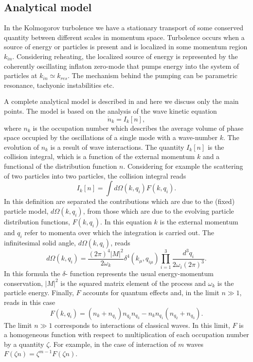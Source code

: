 \documentclass[11pt,a4paper,twoside]{book}
\begin{document}
\subsection{Analytical model}
In the Kolmogorov turbolence we have a stationary transport of some conserved quantity between different scales in momentum space. Turbolence occurs when a source of energy or particles is present and is localized in some momentum region $ k_{in} $. Considering reheating, the localized source of energy is represented by the coherently oscillating inflaton zero-mode that pumps energy into the system of particles at $ k_{in}\simeq k_{res} $. The mechanism behind the pumping can be parametric resonance, tachyonic instabilities etc.

A complete analytical model is described in \cite{Chap6:TurbolentThermalization} and here we discuss only the main points. The model is based on the analysis of the wave kinetic equation
\begin{equation}
\label{Chap6:waveKineticEquation}
\dot{n}_{k}=I_{k}[n],
\end{equation}
where $ n_{k} $ is the occupation number which describes the average volume of phase space occupied  by the oscillations of a single mode with a wave-number $ k $. The evolution of $ n_{k} $ is a result of wave interactions. The quantity $ I_{k}[n] $ is the collision integral, which is a function of the external momentum $ k $ and a functional of the distribution function $ n $. Considering for example the scattering of two particles into two particles, the collision integral reads
\begin{equation}
\label{Chap6:ColisionIntegral}
I_{k}[n] = \int d\Omega(k,q_{i})F(k,q_{i}).
\end{equation}
In this definition are separated the contributions which are due to the (fixed) particle model, $ d\Omega(k,q_{i}) $, from those which are due to the evolving particle distribution functions, $ F(k,q_{i}) $. In this equation $ k $ is the external momentum and $ q_{i} $ refer to momenta over which the integration is carried out. The infinitesimal solid angle, $ d\Omega(k,q_{i}) $, reads
\begin{equation}
\label{Chap6:solidAngle}
d\Omega(k,q_{i}) = \frac{(2\pi)^{4}|M|^{2}}{2\omega_{k}}\delta^{4}(k_{\mu},q_{i\mu})\prod_{i=1}^{3}\frac{d^{3}q_{i}}{2\omega_{i}(2\pi)^{3}}.
\end{equation}
In this formula the $ \delta $- function represents the usual energy-momentum conservation, $ |M|^{2} $ is the squared matrix element of the process and $\omega_{k}$ is the particle energy.
Finally, $ F $ accounts for quantum effects and, in the limit $ n\gg 1 $, reads in this case
\begin{equation}
\label{Chap6:quantumEffectsf}
F(k,q_{i}) = (n_{k} + n_{q_{1}})n_{q_{2}}n_{q_{3}} - n_{k}n_{q_{1}}(n_{q_{2}} + n_{q_{3}}).
\end{equation}
The limit $ n\gg 1 $ corresponds to interactions of classical waves.
In this limit, $ F  $ is a homogeneous function with  respect to multiplication of each occupation number by a quantity $\zeta$. For example, in the case of interaction of $ m $ waves $ F(\zeta n)=\zeta^{m-1}F(\zeta n) $.
\end{document}
